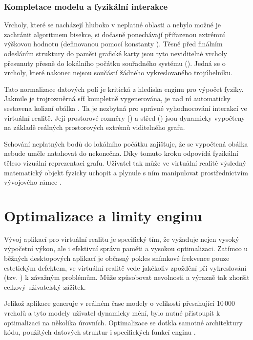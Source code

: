\documentclass[czech, kiv, sem, he, iso690alph, pdf,viewonly]{fasthesis}
\begin{document}
\subsection{Kompletace modelu a fyzikální interakce}
Vrcholy, které se nacházejí hluboko v neplatné oblasti a nebylo možné je zachránit algoritmem bisekce, si dočasně ponechávají přiřazenou extrémní výškovou hodnotu 
(definovanou pomocí konstanty ). Těsně před finálním odesláním struktury do paměti grafické karty jsou tyto neviditelné vrcholy přesunuty přesně do lokálního počátku 
souřadného systému (). Jedná se o vrcholy, které nakonec nejsou součástí žádného vykreslovaného trojúhelníku.

Tato normalizace datových polí je kritická z hlediska enginu pro výpočet fyziky. Jakmile je trojrozměrná síť kompletně vygenerována, je nad ní automaticky sestavena kolizní obálka . 
Ta je nezbytná pro správné vyhodnocování interakcí ve virtuální realitě. Její prostorové rozměry () a střed () 
jsou dynamicky vypočteny na základě reálných prostorových extrémů viditelného grafu. 

Schování neplatných bodů do lokálního počátku zajišťuje, že se vypočtená obálka nebude uměle natahovat do nekonečna. Díky tomuto kroku odpovídá fyzikální těleso vizuální reprezentaci grafu. 
Uživatel tak může ve virtuální realitě výsledný matematický objekt fyzicky uchopit a plynule s ním manipulovat prostřednictvím vývojového rámce .





\chapter{Optimalizace a limity enginu}
Vývoj aplikací pro virtuální realitu je specifický tím, že vyžaduje nejen vysoký výpočetní výkon, ale i efektivní správu paměti a vysokou optimalizaci. 
Zatímco u běžných desktopových aplikací je občasný pokles snímkové frekvence pouze estetickým defektem, ve virtuální realitě vede jakékoliv zpoždění při vykreslování (tzv. ) k závažným problémům. 
Může způsobovat nevolnosti a výrazně tak zhoršit celkový uživatelský zážitek.

Jelikož aplikace generuje v reálném čase modely o velikosti přesahující 10\,000 vrcholů a tyto modely uživatel dynamicky mění, bylo nutné přistoupit k optimalizaci na několika úrovních. 
Optimalizace se dotkla samotné architektury kódu, použitých datových struktur i specifických funkcí enginu .
\end{document}
